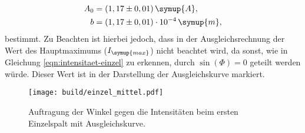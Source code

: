    \begin{align*}
        A_0 &= (1,17 \pm 0,01)               \, \symup{A}, \\
        b   &= (1,17 \pm 0,01) \cdot 10^{-4} \, \symup{m}, 
    \end{align*}
    bestimmt. Zu Beachten ist hierbei jedoch, dass in der Ausgleichsrechnung der Wert des Hauptmaximums ($I_{\symup{max}}$)
    nicht beachtet wird, da sonst, wie in Gleichung 
    \eqref{eqn:intensitaet-einzel} zu erkennen, durch $\sin(\Phi) = 0$ geteilt werden würde.
    Dieser Wert ist in der Darstellung der Ausgleichskurve markiert.
    \begin{figure}
        \centering
        \texttt{[image: build/einzel\_mittel.pdf]}
        \caption{Auftragung der Winkel gegen die Intensitäten beim ersten Einzelspalt mit Ausgleichskurve.}
        \label{fig:einzel_mittel}
    \end{figure}
%
%
